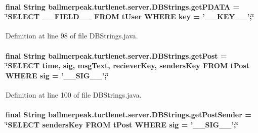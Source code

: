 \hypertarget{classballmerpeak_1_1turtlenet_1_1server_1_1DBStrings_a93ae46feb4aaeb78cac2ba7b4fce04ec}{
\paragraph[{get\-P\-D\-A\-T\-A}]{\setlength{\rightskip}{0pt plus 5cm}final String ballmerpeak.\-turtlenet.\-server.\-D\-B\-Strings.\-get\-P\-D\-A\-T\-A = \char`\"{}S\-E\-L\-E\-C\-T \-\_\-\-\_\-\-F\-I\-E\-L\-D\-\_\-\-\_\- F\-R\-O\-M t\-User W\-H\-E\-R\-E key = '\-\_\-\-\_\-\-K\-E\-Y\-\_\-\-\_\-';\char`\"{}\hspace{0.3cm}{\ttfamily [static]}}}\label{classballmerpeak_1_1turtlenet_1_1server_1_1DBStrings_a93ae46feb4aaeb78cac2ba7b4fce04ec}


Definition at line 98 of file D\-B\-Strings.\-java.

\hypertarget{classballmerpeak_1_1turtlenet_1_1server_1_1DBStrings_a80f3d94ed94b75193a7fd3490548739b}{
\paragraph[{get\-Post}]{\setlength{\rightskip}{0pt plus 5cm}final String ballmerpeak.\-turtlenet.\-server.\-D\-B\-Strings.\-get\-Post = \char`\"{}S\-E\-L\-E\-C\-T time, sig, msg\-Text, reciever\-Key, senders\-Key F\-R\-O\-M t\-Post W\-H\-E\-R\-E sig = '\-\_\-\-\_\-\-S\-I\-G\-\_\-\-\_\-';\char`\"{}\hspace{0.3cm}{\ttfamily [static]}}}\label{classballmerpeak_1_1turtlenet_1_1server_1_1DBStrings_a80f3d94ed94b75193a7fd3490548739b}


Definition at line 100 of file D\-B\-Strings.\-java.

\hypertarget{classballmerpeak_1_1turtlenet_1_1server_1_1DBStrings_ad87c5a646e57a7280c16bc34c599eba2}{
\paragraph[{get\-Post\-Sender}]{\setlength{\rightskip}{0pt plus 5cm}final String ballmerpeak.\-turtlenet.\-server.\-D\-B\-Strings.\-get\-Post\-Sender = \char`\"{}S\-E\-L\-E\-C\-T senders\-Key F\-R\-O\-M t\-Post W\-H\-E\-R\-E sig = '\-\_\-\-\_\-\-S\-I\-G\-\_\-\-\_\-';\char`\"{}\hspace{0.3cm}{\ttfamily [static]}}}\label{classballmerpeak_1_1turtlenet_1_1server_1_1DBStrings_ad87c5a646e57a7280c16bc34c599eba2}


